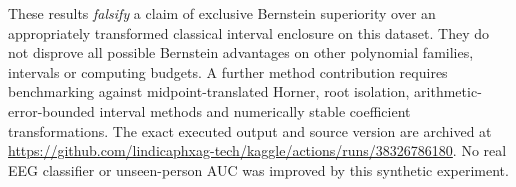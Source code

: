 These results \emph{falsify} a claim of
exclusive Bernstein superiority over an
appropriately transformed classical
interval enclosure on this dataset.
They do not disprove all possible
Bernstein advantages on other polynomial
families, intervals or computing budgets.
A further method contribution requires
benchmarking against
midpoint-translated Horner,
root isolation, arithmetic-error-bounded
interval methods and numerically stable
coefficient transformations.
The exact executed output and source
version are archived at
\url{https://github.com/lindicaphxag-tech/kaggle/actions/runs/38326786180}.
No real EEG classifier or unseen-person AUC
was improved by this synthetic experiment.
